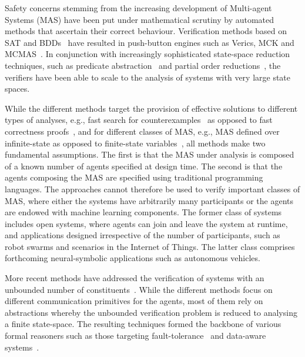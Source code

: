 Safety concerns stemming from the increasing development of Multi-agent Systems
(MAS) have been put under mathematical scrutiny
by automated methods that ascertain their correct behaviour. Verification
methods based on SAT and
BDDs~\cite{KacprzakLomuscioPenczek04b,RaimondiLomuscio05c} have resulted in
push-button engines such as Verics, MCK and
MCMAS~\cite{GammieMeyden04a,Kacprzak+07a,LomuscioQuRaimondi15}.  In conjunction
with increasingly sophisticated state-space reduction techniques, such as
predicate abstraction~\cite{lomuscio2015verifying} and partial order
reductions~\cite{jamroga2020towards}, the verifiers have been able to scale to
the analysis of systems with very large state spaces.


While the different methods target the provision of effective solutions to
different types of analyses, e.g., fast search for
counterexamples~\cite{penczek2003verifying} as opposed to fast correctness
proofs~\cite{ball2006abstraction}, and for different classes of MAS, e.g., MAS
defined over infinite-state as opposed to finite-state
variables~\cite{lomuscio2015verifying}, all methods make two fundamental
assumptions. The first is that the MAS under analysis is composed of a known
number of agents specified at design time. The second is that the agents
composing the MAS are specified using traditional programming languages.  The
approaches cannot
therefore be used to verify important classes of MAS, where either the systems
have arbitrarily many participants or the agents are endowed with machine
learning components. The former class of systems includes open systems, where
agents can join and leave the system at runtime, and applications designed
irrespective of the number of participants, such as robot
swarms and scenarios
in the Internet of Things. The latter class comprises forthcoming
neural-symbolic applications such as autonomous vehicles.

More recent methods have addressed the verification of
systems with an unbounded number of
constituents~\cite{KouvarosLomuscio16a,KouvarosLomuscio16c}.
While the different methods focus on different communication
primitives for the agents, most of them rely on abstractions
whereby the unbounded verification problem is reduced to
analysing a finite state-space. The resulting techniques
formed the backbone of various formal reasoners such as
those targeting
fault-tolerance~\cite{KouvarosLomuscioPirovano18} and
data-aware systems~\cite{BelardinelliKouvarosLomuscio17}.

